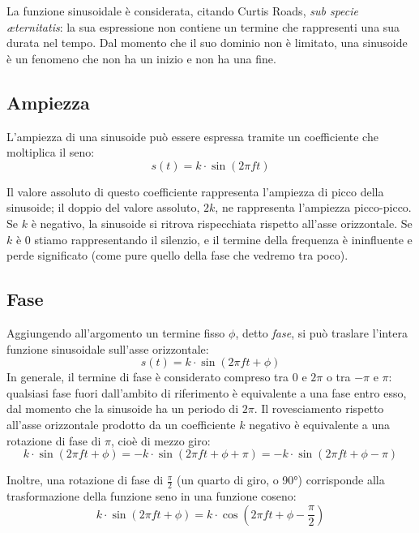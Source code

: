 La funzione sinusoidale è considerata, citando Curtis Roads, \emph{sub specie \ae{}ternitatis}: la sua espressione non contiene un termine che rappresenti una sua durata nel tempo. Dal momento che il suo dominio non è limitato, una sinusoide è un fenomeno che non ha un inizio e non ha una fine.


\subsection{Ampiezza}

L'ampiezza di una sinusoide può essere espressa tramite un coefficiente che moltiplica il seno:
\begin{equation}
s(t) = k \cdot \sin(2 \pi f t)
\end{equation}

Il valore assoluto di questo coefficiente rappresenta l'ampiezza di picco della sinusoide; il doppio del valore assoluto, $2k$, ne rappresenta l'ampiezza picco-picco. Se $k$ è negativo, la sinusoide si ritrova rispecchiata rispetto all'asse orizzontale. Se $k$ è 0 stiamo rappresentando il silenzio, e il termine della frequenza è ininfluente e perde significato (come pure quello della fase che vedremo tra poco).


\subsection{Fase}

Aggiungendo all'argomento un termine fisso $\phi$, detto \emph{fase}, si può traslare l'intera funzione sinusoidale sull'asse orizzontale:
\begin{equation}
s(t) = k \cdot \sin(2 \pi f t + \phi)
\end{equation}
In generale, il termine di fase è considerato compreso tra 0 e $2 \pi$ o tra $-\pi$ e $\pi$: qualsiasi fase fuori dall'ambito di riferimento è equivalente a una fase entro esso, dal momento che la sinusoide ha un periodo di $2 \pi$. Il rovesciamento rispetto all'asse orizzontale prodotto da un coefficiente $k$ negativo è equivalente a una rotazione di fase di $\pi$, cioè di mezzo giro:
\begin{equation}
k \cdot \sin(2 \pi f t + \phi) = -k \cdot \sin(2 \pi f t + \phi + \pi) = -k \cdot \sin(2 \pi f t + \phi - \pi)
\end{equation}

Inoltre, una rotazione di fase di $\frac{\pi}{2}$ (un quarto di giro, o 90°) corrisponde alla trasformazione della funzione seno in una funzione coseno:
\begin{equation}
k \cdot \sin(2 \pi f t + \phi) = k \cdot \cos(2 \pi f t + \phi - \frac{\pi}{2})
\end{equation}


